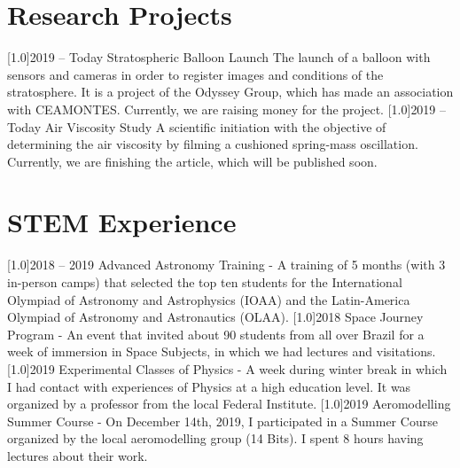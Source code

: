\documentclass[]{cv-style}
\begin{document}
\section{Research Projects}
    \vspace{-0.2cm}
    \begin{entrylist}
        \entry
            {\scalebox{.8}[1.0]{2019 -- Today}}
            {Stratospheric Balloon Launch}
            {}
            {The launch of a balloon with sensors and cameras in order to register images and conditions of the stratosphere. It is a project of the Odyssey Group, which has made an association with CEAMONTES. Currently, we are raising money for the project.}
        \entry
            {\scalebox{.8}[1.0]{2019 -- Today}}
            {Air Viscosity Study}
            {}
            {A scientific initiation with the objective of determining the air viscosity by filming a cushioned spring-mass oscillation. Currently, we are finishing the article, which will be published soon.}
\end{entrylist}

\section{STEM Experience}
    \vspace{-0.2cm}
    \begin{entrylist}
        \entry
            {\scalebox{.8}[1.0]{2018 -- 2019}}
            {Advanced Astronomy Training - {}}
            {}
            {A training of 5 months (with 3 in-person camps) that selected the top ten students for the International Olympiad of Astronomy and Astrophysics (IOAA) and the Latin-America Olympiad of Astronomy and Astronautics (OLAA).}
        \entry
            {\scalebox{.8}[1.0]{2018}}
            {Space Journey Program - {}}
            {}
            {An event that invited about 90 students from all over Brazil for a week of immersion in Space Subjects, in which we had lectures and visitations.}
        \entry
            {\scalebox{.8}[1.0]{2019}}
            {Experimental Classes of Physics - {}}
            {}
            {A week during winter break in which I had contact with experiences of Physics at a high education level. It was organized by a professor from the local Federal Institute.}
        \entry
            {\scalebox{.8}[1.0]{2019}}
            {Aeromodelling Summer Course - {}}
            {}
            {On December 14th, 2019, I participated in a Summer Course organized by the local aeromodelling group (14 Bits). I spent 8 hours having lectures about their work.}
    \end{entrylist}
\end{document}
